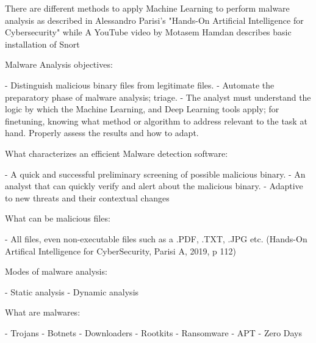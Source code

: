 There are different methods to apply Machine Learning to perform malware analysis as described in Alessandro Parisi's "Hands-On Artificial Intelligence for Cybersecurity"\cite{Parisi2019} while A YouTube video by Motasem Hamdan describes basic installation of Snort\cite{YouTube2022_HamdanM}




Malware Analysis objectives:

- Distinguish malicious binary files from legitimate files.
- Automate the preparatory phase of malware analysis; triage.
- The analyst must understand the logic by which the Machine Learning, and Deep Learning tools apply; for finetuning, knowing what method or algorithm to address relevant to the task at hand. Properly assess the results and how to adapt.

What characterizes an efficient Malware detection software:

- A quick and successful preliminary screening of possible malicious binary.
- An analyst that can quickly verify and alert about the malicious binary.
- Adaptive to new threats and their contextual changes

What can be malicious files:

- All files, even non-executable files such as a .PDF, .TXT, .JPG etc. (Hands-On Artifical Intelligence for CyberSecurity, Parisi A, 2019, p 112)

Modes of malware analysis:

- Static analysis
- Dynamic analysis


What are malwares:

- Trojans
- Botnets
- Downloaders
- Rootkits
- Ransomware
- APT
- Zero Days

